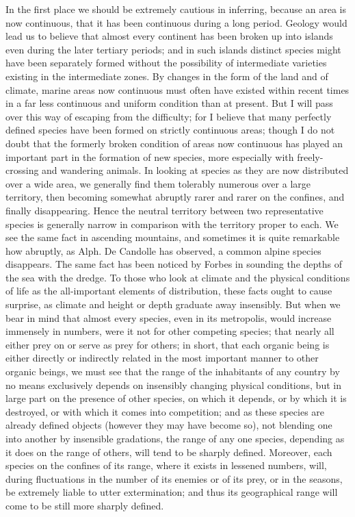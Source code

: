 In the first place we should be extremely cautious in inferring, because an area is now continuous, that it has been continuous during a long period. Geology would lead us to believe that almost every continent has been broken up into islands even during the later tertiary periods; and in such islands distinct species might have been separately formed without the possibility of intermediate varieties existing in the intermediate zones. By changes in the form of the land and of climate, marine areas now continuous must often have existed within recent times in a far less continuous and uniform condition than at present. But I will pass over this way of escaping from the difficulty; for I believe that many perfectly defined species have been formed on strictly continuous areas; though I do not doubt that the formerly broken condition of areas now continuous has played an important part in the formation of new species, more especially with freely-crossing and wandering animals.
In looking at species as they are now distributed over a wide area, we generally find them tolerably numerous over a large territory, then becoming somewhat abruptly rarer and rarer on the confines, and finally disappearing. Hence the neutral territory between two representative species is generally narrow in comparison with the territory proper to each. We see the same fact in ascending mountains, and sometimes it is quite remarkable how abruptly, as Alph. De Candolle has observed, a common alpine species disappears. The same fact has been noticed by Forbes in sounding the depths of the sea with the dredge. To those who look at climate and the physical conditions of life as the all-important elements of distribution, these facts ought to cause surprise, as climate and height or depth graduate away insensibly. But when we bear in mind that almost every species, even in its metropolis, would increase immensely in numbers, were it not for other competing species; that nearly all either prey on or serve as prey for others; in short, that each organic being is either directly or indirectly related in the most important manner to other organic beings, we must see that the range of the inhabitants of any country by no means exclusively depends on insensibly changing physical conditions, but in large part on the presence of other species, on which it depends, or by which it is destroyed, or with which it comes into competition; and as these species are already defined objects (however they may have become so), not blending one into another by insensible gradations, the range of any one species, depending as it does on the range of others, will tend to be sharply defined. Moreover, each species on the confines of its range, where it exists in lessened numbers, will, during fluctuations in the number of its enemies or of its prey, or in the seasons, be extremely liable to utter extermination; and thus its geographical range will come to be still more sharply defined.
